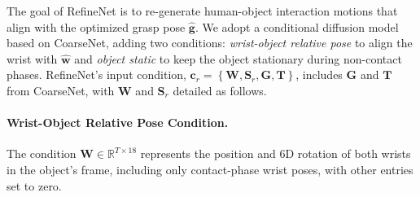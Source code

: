 
The goal of RefineNet is to re-generate human-object interaction motions that align with the optimized grasp pose $\hat{\bm{g}}$. We adopt a conditional diffusion model based on CoarseNet, adding two conditions: \textit{wrist-object relative pose} to align the wrist with $\hat{\bm{w}}$ and \textit{object static} to keep the object stationary during non-contact phases. RefineNet’s input condition, $\bm{c}_{r} = \left\{\bm{W}, \bm{S}_{r}, \bm{G}, \bm{T}\right\}$, includes $\bm{G}$ and $\bm{T}$ from CoarseNet, with $\bm{W}$ and $\bm{S}_{r}$ detailed as follows. 


\vspace{-3mm}
\paragraph{Wrist-Object Relative Pose Condition.} 
The condition $\bm{W} \in \mathbb{R}^{T \times 18}$ represents the position and 6D rotation of both wrists in the object's frame, including only contact-phase wrist poses, with other entries set to zero.

\vspace{-2mm}
